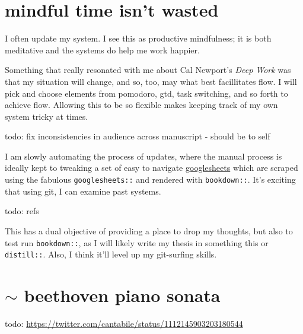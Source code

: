 \documentclass[]{book}
\begin{document}
\hypertarget{mindful-time-isnt-wasted}{%
\section{mindful time isn't wasted}\label{mindful-time-isnt-wasted}}

I often update my system. I see this as productive mindfulness; it is both meditative and the systems do help me work happier.

Something that really resonated with me about Cal Newport's \emph{Deep Work} was that my situation will change, and so, too, may what best facillitates flow. I will pick and choose elements from pomodoro, gtd, task switching, and so forth to achieve flow. Allowing this to be so flexible makes keeping track of my own system tricky at times.

todo: fix inconsistencies in audience across manuscript - should be to self

I am slowly automating the process of updates, where the manual process is ideally kept to tweaking a set of easy to navigate \href{https://docs.google.com/spreadsheets/d/1hv7pkBGu8XQQOIBbBt1_1LvKGBR7zTdQYCzogrv3hz0/edit?usp=sharing}{googlesheets} which are scraped using the fabulous \texttt{googlesheets::} and rendered with \texttt{bookdown::}. It's exciting that using git, I can examine past systems.

todo: refs

This has a dual objective of providing a place to drop my thoughts, but also to test run \texttt{bookdown::}, as I will likely write my thesis in something this or \texttt{distill::}. Also, I think it'll level up my git-surfing skills.

\hypertarget{sim-beethoven-piano-sonata}{%
\section{\texorpdfstring{\(\sim\) beethoven piano sonata}{\textbackslash{}sim beethoven piano sonata}}\label{sim-beethoven-piano-sonata}}

todo:
\url{https://twitter.com/cantabile/status/1112145903203180544}


\end{document}
